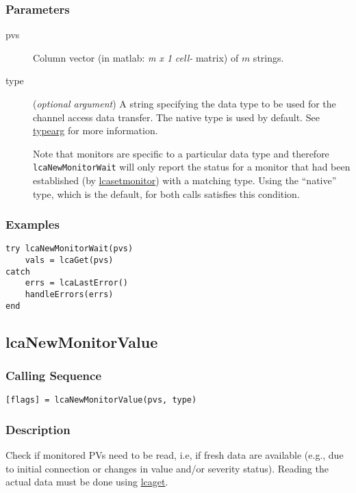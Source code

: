 \documentclass{article}
\newcommand{\com}[1]{{\tt #1}}
\newcommand{\pbrk}{\pagebreak[3]}
\newcommand{\comref}[2]{\hyperref{\com{#1}}{\com{#1} (see }{)}{#2}}
\newcommand{\ita}[1]{\emph{#1}}
\newcommand{\m}{$m$}
\newcommand{\mhack}{$m$} %
\newcommand{\mxl}{$m\times 1$}
\renewcommand{\m}{\ita{m}}
\newcommand{\mhack}{\ita{m}} %
\renewcommand{\mxl}{\ita{m x 1}}
\renewcommand{\pbrk}{}
\newcommand{\PVITEM}{
\item[pvs] Column vector (in matlab: \mxl{} \ita{cell-} matrix)
of \mhack{} strings.
}
\begin{document}
\subsubsection{Parameters}
\begin{description}
\PVITEM
\item[type]
(\ita{optional argument}) A string specifying the
data type to be used for the channel access data transfer. The
native type is used by default.
See \hyperref{here}{(}{)}{typearg} for more information.

Note that monitors are specific to a particular data type and therefore
\com{lcaNewMonitorWait} will only report the status for a monitor that had been established
(by \comref{lcaSetMonitor}{lcasetmonitor}) with a matching type.
Using the ``native'' type, which is the default, for both calls
satisfies this condition.
\end{description}
\subsubsection{Examples}
\begin{verbatim}
try lcaNewMonitorWait(pvs)
	vals = lcaGet(pvs)
catch
	errs = lcaLastError()
	handleErrors(errs)
end
\end{verbatim}

\pbrk
\subsection{lcaNewMonitorValue}
\label{lcanewmonitorvalue}
\subsubsection{Calling Sequence}
\begin{verbatim}
[flags] = lcaNewMonitorValue(pvs, type)
\end{verbatim}
\subsubsection{Description}
Check if monitored PVs need to be read, i.e, if fresh data are available (e.g., due to
initial connection or changes in value and/or severity status). Reading the actual
data must be done using \comref{lcaGet}{lcaget}.
\end{document}
